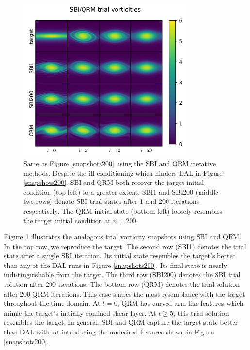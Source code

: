 \documentclass[%
 reprint,
 amsmath,amssymb,
 aps,
 pre,
]{revtex4-2}
\begin{document}
\begin{figure}
  \centering
  \includegraphics[width=3.5in]{Falsesmolwrite000200.png}
  \caption{Same as Figure \ref{snapshots200} using the SBI and QRM iterative methods.
  Despite the ill-conditioning which hinders DAL in Figure \ref{snapshots200}, SBI and QRM both recover the target initial condition (top left) to a greater extent.
  SBI1 and SBI200 (middle two rows) denote SBI trial states after 1 and 200 iterations respectively.
  The QRM initial state (bottom left) loosely resembles the target initial condition at $n=200$.}
  \label{snapshots200_sbi}
\end{figure}

Figure \ref{snapshots200_sbi} illustrates the analogous trial vorticity snapshots using SBI and QRM.
In the top row, we reproduce the target.
The second row (SBI1) denotes the trial state after a single SBI iteration.
Its initial state resembles the target's better than any of the DAL runs in Figure \ref{snapshots200}.
Its final state is nearly indistinguishable from the target.
The third row (SBI200) denotes the SBI trial solution after 200 iterations.
The bottom row (QRM) denotes the trial solution after 200 QRM iterations.
This case shares the most resemblance with the target throughout the time domain.
At $t=0$, QRM has curved arm-like features which mimic the target's initially confined shear layer.
At $t\geq 5$, this trial solution resembles the target.
In general, SBI and QRM capture the target state better than DAL without introducing the undesired features shown in Figure \ref{snapshots200}.
\end{document}

